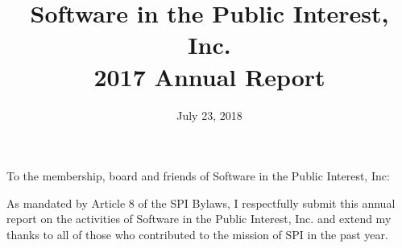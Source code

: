 \documentclass[a4paper]{report}
\begin{document}
\title{Software in the Public Interest, Inc.\\
2017 Annual Report}
\date{July 23, 2018}

\maketitle

\newpage


\hspace{1em}

To the membership, board and friends of Software in the Public Interest, Inc:

As mandated by Article 8 of the SPI Bylaws, I respectfully submit this annual
report on the activities of Software in the Public Interest, Inc. and extend my
thanks to all of those who contributed to the mission of SPI in the past year.
\end{document}
